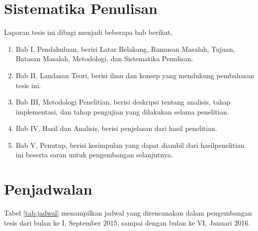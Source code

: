 \documentclass[12pt,a4paper,titlepage]{article}
\begin{document}
\section{Sistematika Penulisan}\label{sec:sistematika-penulisan}

Laporan tesis ini dibagi menjadi beberapa bab berikut,
\begin{enumerate}
	\item Bab I, Pendahuluan, berisi Latar Belakang, Rumusan Masalah,
Tujuan, Batasan Masalah, Metodologi, dan Sistematika Penulisan.
	\item Bab II, Landasan Teori, berisi ilmu dan konsep yang mendukung
pembahasan tesis ini.
	\item Bab III, Metodologi Penelitian, berisi deskripsi tentang
analisis, tahap implementasi, dan tahap pengujian yang dilakukan selama
penelitian.
	\item Bab IV, Hasil dan Analisis, berisi penjelasan dari hasil
penelitian.
	\item Bab V, Penutup, berisi kesimpulan yang dapat diambil dari
hasil\linebreak penelitian ini beserta saran untuk pengembangan selanjutnya.
\end{enumerate}

\clearpage
\section{Penjadwalan}\label{sec:penjadwalan}

Tabel \ref{tab:jadwal} menampilkan jadwal yang direncanakan dalam pengembangan
tesis dari bulan ke I, September 2015, sampai dengan bulan ke VI, Januari 2016.

\renewcommand{\arraystretch}{1.5}
\setlength{\tabcolsep}{3pt}
\newcommand{\tand}{&}
\newcommand{\fillcell}[1]{%
	\forloop{cnt}{0}{\value{cnt}<#1}{%
		{\cellcolor[gray]{0.7}} \tand
	}%
}
\newcommand{\emptycell}[2]{%
	\forloop{cnt}{0}{\value{cnt}<#1}{%
		\tand
	}%
	\ifthenelse{#2 = 1}{\\}{\tand}%
}
\end{document}

